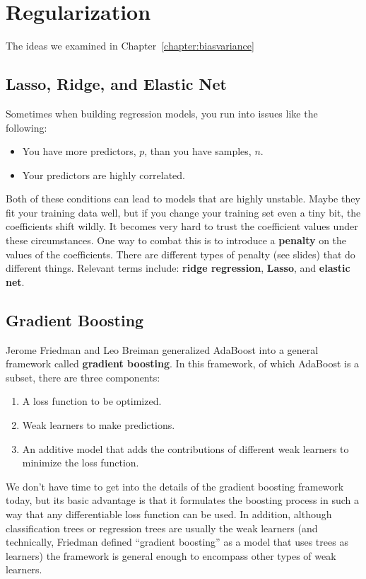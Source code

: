 \chapter{Regularization \label{chapter:lassoridge}}

The ideas we examined in Chapter~\ref{chapter:biasvariance} 

\section{Lasso, Ridge, and Elastic Net}

Sometimes when building regression models, you run into issues like the following:

\begin{itemize}
\item You have more predictors, $p$, than you have samples, $n$.
\item Your predictors are highly correlated.
\end{itemize}

Both of these conditions can lead to models that are highly unstable. Maybe they fit your training data well, but if you change your training set even a tiny bit, the coefficients shift wildly. It becomes very hard to trust the coefficient values under these circumstances. One way to combat this is to introduce a \textbf{penalty} on the values of the coefficients. There are different types of penalty (see slides) that do different things. Relevant terms include: \textbf{ridge regression}, \textbf{Lasso}, and \textbf{elastic net}.


\section{Gradient Boosting}

Jerome Friedman and Leo Breiman generalized AdaBoost into a general framework called \textbf{gradient boosting}. In this framework, of which AdaBoost is a subset, there are three components:

\begin{enumerate}
\item A loss function to be optimized.
\item Weak learners to make predictions.
\item An additive model that adds the contributions of different weak learners to minimize the loss function.
\end{enumerate}

We don't have time to get into the details of the gradient boosting framework today, but its basic advantage is that it formulates the boosting process in such a way that any differentiable loss function can be used. In addition, although classification trees or regression trees are usually the weak learners (and technically, Friedman defined ``gradient boosting'' as a model that uses trees as learners) the framework is general enough to encompass other types of weak learners. 